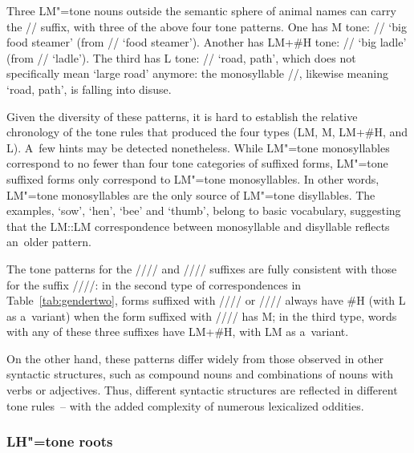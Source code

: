 	Three LM"=tone nouns outside the semantic sphere of animal names can carry the // suffix,
	with three of the above four tone patterns. One has M tone: // ‘big food steamer’ (from
	// ‘food steamer’). Another has LM+\#H tone: // ‘big ladle’ (from
	// ‘ladle’). The third has L tone: // ‘road, path’, which does not
	specifically mean ‘large road’ anymore: the monosyllable //, likewise meaning ‘road,
	path’, is falling into disuse.
	
	Given the diversity of these patterns, it is hard to establish the relative chronology of the tone
	rules that produced the four types (LM, M, LM+\#H, and L). A~few hints may be detected
	nonetheless. While LM"=tone monosyllables correspond to no fewer than four tone categories of
	suffixed forms, LM"=tone suffixed forms only correspond to LM"=tone monosyllables. In other words,
	LM"=tone monosyllables are the only source of LM"=tone disyllables. The examples, ‘sow’, ‘hen’, ‘bee’ and ‘thumb’, belong to basic vocabulary, suggesting that the LM::LM {correspondence} between monosyllable and disyllable reflects an~older
	pattern.
	
	The tone patterns for the //// and //// suffixes are fully consistent with those for
	the suffix ////: in the second type of correspondences in Table~\ref{tab:gendertwo}, forms suffixed with //// or //// always have \#H (with
	L as a~variant) when the form suffixed with //// has M; in the third type, words with any of these three suffixes have LM+\#H, with LM as
	a~variant. 
	
	On the other hand, these patterns differ widely from those observed in other syntactic
	structures, such as compound nouns and combinations of nouns with verbs or adjectives. Thus, different syntactic structures are reflected in different tone rules~-- with the added complexity of numerous lexicalized oddities.
	
	\subsubsection{LH"=tone roots}
	\label{sec:lhtoneroots}
	
